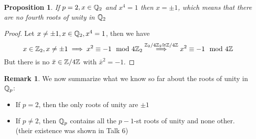 \documentclass[a4paper]{article}
\theoremstyle{plain}
\newtheorem{prop}[thm]{Proposition}
\theoremstyle{definition}
\newtheorem{rem}[thm]{Remark}
\begin{document}
\begin{prop} If $p = 2, x \in \Bbb Q_{2}$ and $x^{4} = 1$ then $x = \pm 1$, which means that there are no fourth roots of unity in $\Bbb Q_{2}$
\end{prop}
\begin{proof}
  Let $x \neq \pm 1, x \in \Bbb Q_{2}, x^{4} = 1$, then we have
  $$x \in \Bbb Z_{2}, x \neq \pm 1 \implies x^{2} \equiv -1 \mod 4\Bbb Z_{2} \overset {\Bbb Z_{2}/4\Bbb Z_{2} \cong \Bbb Z/4\Bbb Z}\implies x^{2} \equiv -1 \mod 4\Bbb Z$$
  But there is no $\bar x \in \Bbb Z/4\Bbb Z$ with $\bar x^{2} = -1$.
\end{proof}
\begin{rem}
  We now summarize what we know so far about the roots of unity in $\Bbb Q_{p}$:
  \begin{itemize}
    \item If $p=2$, then the only roots of unity are $\pm 1$
    \item If $p \neq 2$, then $\Bbb Q_{p}$ contains all the $p-1$-st roots of unity and none other. (their existence was shown in Talk 6)
  \end{itemize}

\end{rem}
\end{document}
